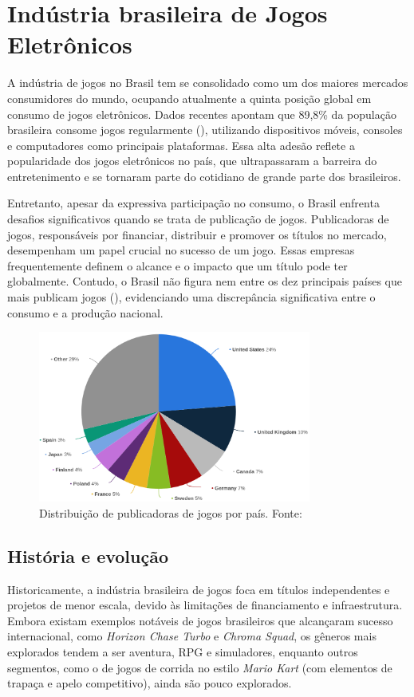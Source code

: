 \chapter{Indústria brasileira de Jogos Eletrônicos}

A indústria de jogos no Brasil tem se consolidado como um dos maiores mercados consumidores do mundo, ocupando atualmente a quinta posição global em consumo de jogos eletrônicos. Dados recentes apontam que 89,8\% da população brasileira consome jogos regularmente (\cite{internetGame:share}), utilizando dispositivos móveis, consoles e computadores como principais plataformas. Essa alta adesão reflete a popularidade dos jogos eletrônicos no país, que ultrapassaram a barreira do entretenimento e se tornaram parte do cotidiano de grande parte dos brasileiros.

Entretanto, apesar da expressiva participação no consumo, o Brasil enfrenta desafios significativos quando se trata de publicação de jogos. Publicadoras de jogos, responsáveis por financiar, distribuir e promover os títulos no mercado, desempenham um papel crucial no sucesso de um jogo. Essas empresas frequentemente definem o alcance e o impacto que um título pode ter globalmente. Contudo, o Brasil não figura nem entre os dez principais países que mais publicam jogos (\cite{publishers:country}), evidenciando uma discrepância significativa entre o consumo e a produção nacional.

\begin{figure}[H]
    \centering
    \includegraphics[width=0.8\textwidth]{figuras/Devs by Country.png}
    \caption{Distribuição de publicadoras de jogos por país. Fonte: \cite{publishers:country}}
    \label{fig:jogos-brasil}
\end{figure}

\section{História e evolução}
Historicamente, a indústria brasileira de jogos foca em títulos independentes e projetos de menor escala, devido às limitações de financiamento e infraestrutura. Embora existam exemplos notáveis de jogos brasileiros que alcançaram sucesso internacional, como \textit{Horizon Chase Turbo}\label{Língua estrangeira} e \textit{Chroma Squad}, os gêneros mais explorados tendem a ser aventura, RPG e simuladores, enquanto outros segmentos, como o de jogos de corrida no estilo \textit{Mario Kart} (com elementos de trapaça e apelo competitivo), ainda são pouco explorados.

